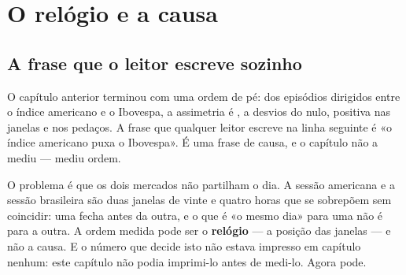 
\chapter{O relógio e a causa}\label{cap:relogio}

\section{A frase que o leitor escreve sozinho}

O capítulo anterior terminou com uma ordem de pé: dos episódios dirigidos entre o índice americano
e o Ibovespa, a assimetria é \numConjuntaAssimetria, a \numConjuntaDesvios{} desvios do nulo,
positiva nas janelas e nos pedaços. A frase que qualquer leitor escreve na linha seguinte é «o
índice americano puxa o Ibovespa». É uma frase de causa, e o capítulo não a mediu --- mediu ordem.

O problema é que os dois mercados não partilham o dia. A sessão americana e a sessão brasileira são
duas janelas de vinte e quatro horas que se sobrepõem sem coincidir: uma fecha antes da outra, e o
que é «o mesmo dia» para uma não é para a outra. A ordem medida pode ser o \textbf{relógio} --- a
posição das janelas --- e não a causa. E o número que decide isto não estava impresso em capítulo
nenhum: este capítulo não podia imprimi-lo antes de medi-lo. Agora pode.

